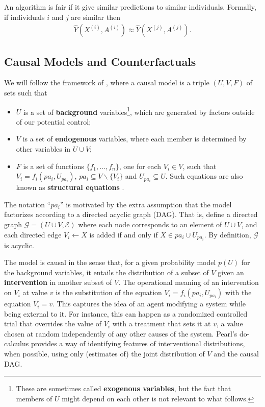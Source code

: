\begin{define}
  An algorithm is fair if it give similar predictions to similar individuals. Formally, if individuals $i$ and $j$ are similar then
\begin{align}
  \hat{Y}(X^{(i)}, A^{(i)}) \approx \hat{Y}(X^{(j)}, A^{(j)}).\nonumber
\end{align}
\end{define}


\subsection{Causal Models and Counterfactuals}
\label{subsec:cmc}
We will follow the framework of \citet{pearl:00}, where a causal
model is a triple $(U, V, F)$ of sets such that
\begin{itemize}
\item $U$ is a set of {\bf background} variables\footnote{These are
  sometimes called {\bf exogenous variables}, but the fact that members of $U$
  might depend on each other is not relevant to what follows.}, which are generated by factors
outside of our potential control;
\item $V$ is a set of {\bf endogenous} variables, where each member is determined by
  other variables in $U \cup V$;
\item $F$ is a set of functions $\{f_1, \dots, f_n\}$, one for each $V_i \in V$, such
that $V_i = f_i(pa_i, U_{pa_i})$, $pa_i \subseteq V \backslash
\{V_i\}$ and $U_{pa_i} \subseteq U$. Such equations are also known as
{\bf structural equations} \citep{bol:89}.
\end{itemize}

The notation ``$pa_i$'' is motivated by the extra assumption that the
model factorizes according to a directed acyclic graph (DAG). That is,
define a directed graph ${\mathcal G}=(U \cup V, \mathcal E )$ where each node corresponds to an
element of $U \cup V$, and each directed edge $V_i \leftarrow X$ is added if
and only if $X \in pa_i \cup U_{pa_i}$. By definition, $\mathcal G$ is
acyclic.

The model is causal in the sense that, for a given probability model
$p(U)$ for the background variables, it entails the distribution of a
subset of $V$ given an {\bf intervention} in another subset of $V$.
The operational meaning of an intervention on $V_i$ at value $v$ is
the substitution of the equation $V_i = f_i(pa_i, U_{pa_i})$ with the
equation $V_i = v$. This captures the idea of an agent modifying a
system while being external to it. For instance, this can happen as a
randomized controlled trial that overrides the value of $V_i$ with a
treatment that sets it at $v$, a value chosen at random independently
of any other causes of the system. Pearl's do-calculus
\citep{pearl:00} provides a way of identifying features of 
interventional distributions, when possible, using only (estimates of) the joint
distribution of $V$ and the causal DAG.

